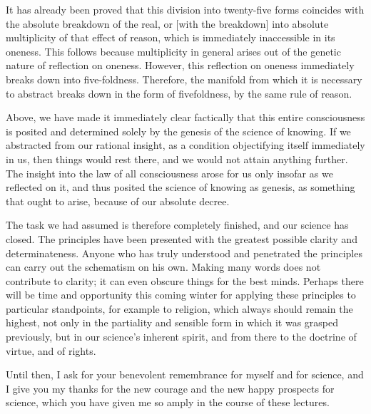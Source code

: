 It has already been proved that
this division into twenty-five forms
coincides with the absolute breakdown of the real,
or [with the breakdown] into absolute multiplicity
of that effect of reason,
which is immediately inaccessible in its oneness.
This follows because multiplicity in general
arises out of the genetic nature of reflection on oneness.
However, this reflection on oneness
immediately breaks down into five-foldness.
Therefore, the manifold from which it is necessary
to abstract breaks down in the form of fivefoldness,
by the same rule of reason.

Above, we have made it immediately clear factically that
this entire consciousness is posited and determined
solely by the genesis of the science of knowing.
If we abstracted from our rational insight,
as a condition objectifying itself immediately in us,
then things would rest there,
and we would not attain anything further.
The insight into the law of all consciousness
arose for us only insofar as we reflected on it,
and thus posited the science of knowing as genesis,
as something that ought to arise,
because of our absolute decree.

The task we had assumed is therefore completely finished,
and our science has closed.
The principles have been presented
with the greatest possible clarity and determinateness.
Anyone who has truly understood and penetrated
the principles can carry out the schematism on his own.
Making many words does not contribute to clarity;
it can even obscure things for the best minds.
Perhaps there will be time and opportunity
this coming winter for applying these principles
to particular standpoints,
for example to religion,
which always should remain the highest,
not only in the partiality and sensible form
in which it was grasped previously,
but in our science’s inherent spirit,
and from there to the doctrine
of virtue, and of rights.

Until then, I ask for your benevolent
remembrance for myself and for science,
and I give you my thanks for the new courage
and the new happy prospects for science,
which you have given me so amply
in the course of these lectures.
